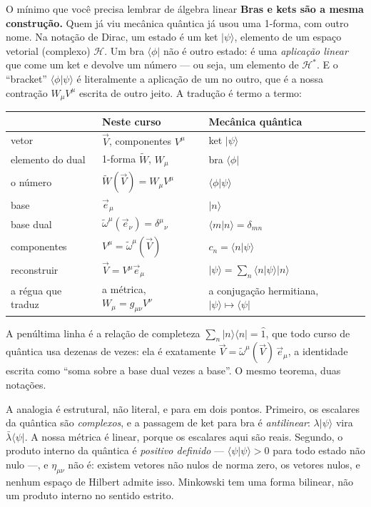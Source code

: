 \documentclass[12pt,a4paper,oneside]{book}
\theoremstyle{rgplain}
\theoremstyle{rgremark}
\newcommand{\ket}[1]{\lvert #1 \rangle}
\newcommand{\bra}[1]{\langle #1 \rvert}
\newcommand{\braket}[2]{\langle #1 \vert #2 \rangle}
\begin{document}
\begin{interludio}{O mínimo que você precisa lembrar de álgebra linear}
\textbf{Bras e kets são a mesma construção.} Quem já viu mecânica quântica já
usou uma 1-forma, com outro nome. Na notação de Dirac, um estado é um ket
$\ket{\psi}$, elemento de um espaço vetorial (complexo) $\mathcal{H}$. Um bra
$\bra{\phi}$ não é outro estado: é uma \emph{aplicação linear} que come um ket
e devolve um número --- ou seja, um elemento de $\mathcal{H}^*$. E o
``bracket'' $\braket{\phi}{\psi}$ é literalmente a aplicação de um no outro,
que é a nossa contração $W_\mu V^\mu$ escrita de outro jeito. A tradução é
termo a termo:

\begin{center}
\small
\begin{tabular}{@{}lll@{}}
\toprule
& Neste curso & Mecânica quântica \\
\midrule
vetor              & $\vec V$, componentes $V^\mu$ & ket $\ket{\psi}$ \\
elemento do dual   & 1-forma $\tilde W$, $W_\mu$ & bra $\bra{\phi}$ \\
o número           & $\tilde W(\vec V)=W_\mu V^\mu$ & $\braket{\phi}{\psi}$ \\
base               & $\vec e_\mu$ & $\ket{n}$ \\
base dual          & $\tilde\omega^\mu(\vec e_\nu)=\delta^\mu{}_\nu$ &
                     $\braket{m}{n}=\delta_{mn}$ \\
componentes        & $V^\mu=\tilde\omega^\mu(\vec V)$ &
                     $c_n=\braket{n}{\psi}$ \\
reconstruir        & $\vec V=V^\mu\vec e_\mu$ &
                     $\ket{\psi}=\sum_n\braket{n}{\psi}\ket{n}$ \\
a régua que traduz & a métrica, $W_\mu=g_{\mu\nu}V^\nu$ &
                     a conjugação hermitiana, $\ket{\psi}\mapsto\bra{\psi}$ \\
\bottomrule
\end{tabular}
\end{center}

A penúltima linha é a relação de completeza $\sum_n\ket{n}\bra{n}=\hat1$, que
todo curso de quântica usa dezenas de vezes: ela é exatamente
$\vec V=\tilde\omega^\mu(\vec V)\,\vec e_\mu$, a identidade escrita como
``soma sobre a base dual vezes a base''. O mesmo teorema, duas notações.

\begin{atencao}[title={\sffamily\bfseries\footnotesize\color{rgTerracota}ONDE O PARALELO QUEBRA}]
A analogia é estrutural, não literal, e para em dois pontos. Primeiro, os
escalares da quântica são \emph{complexos}, e a passagem de ket para bra é
\emph{antilinear}: $\lambda\ket{\psi}$ vira $\bar\lambda\bra{\psi}$. A nossa
métrica é linear, porque os escalares aqui são reais. Segundo, o produto
interno da quântica é \emph{positivo definido} --- $\braket{\psi}{\psi}>0$ para
todo estado não nulo ---, e $\eta_{\mu\nu}$ não é: existem vetores não nulos de
norma zero, os vetores nulos, e nenhum espaço de Hilbert admite isso. Minkowski
tem uma forma bilinear, não um produto interno no sentido estrito.
\end{atencao}


\end{interludio}
\end{document}
